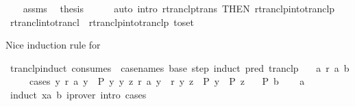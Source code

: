\begin{isabellebody}
\ \ \isamarkupfalse%
\ assms\ \isamarkupfalse%
\ {\isacharquery}{\kern0pt}thesis\isanewline
\ \ \ \ \isamarkupfalse%
\ {\isacharparenleft}{\kern0pt}auto\ intro{\isacharcolon}{\kern0pt}\ rtranclp{\isacharunderscore}{\kern0pt}trans\ {\isacharbrackleft}{\kern0pt}THEN\ rtranclp{\isacharunderscore}{\kern0pt}into{\isacharunderscore}{\kern0pt}tranclp{}{\isacharbrackright}{\kern0pt}{\isacharparenright}{\kern0pt}\isanewline
{}\isamarkupfalse%
%
\endisatagproof
{\isafoldproof}%
%
\isadelimproof
\isanewline
%
\endisadelimproof
\isanewline
{}\isamarkupfalse%
\ rtrancl{\isacharunderscore}{\kern0pt}into{\isacharunderscore}{\kern0pt}trancl{}\ {\isacharequal}{\kern0pt}\ rtranclp{\isacharunderscore}{\kern0pt}into{\isacharunderscore}{\kern0pt}tranclp{}\ {\isacharbrackleft}{\kern0pt}to{\isacharunderscore}{\kern0pt}set{\isacharbrackright}{\kern0pt}%
\begin{isamarkuptext}%
Nice induction rule for %
\end{isamarkuptext}\isamarkuptrue%
\isamarkupfalse%
\ tranclp{\isacharunderscore}{\kern0pt}induct\ {\isacharbrackleft}{\kern0pt}consumes\ {}{\isacharcomma}{\kern0pt}\ case{\isacharunderscore}{\kern0pt}names\ base\ step{\isacharcomma}{\kern0pt}\ induct\ pred{\isacharcolon}{\kern0pt}\ tranclp{\isacharbrackright}{\kern0pt}{\isacharcolon}{\kern0pt}\isanewline
\ \ \ a{\isacharcolon}{\kern0pt}\ {\isachardoublequoteopen}r\isactrlsup {\isacharplus}{\kern0pt}\isactrlsup {\isacharplus}{\kern0pt}\ a\ b{\isachardoublequoteclose}\isanewline
\ \ \ \ \ cases{\isacharcolon}{\kern0pt}\ {\isachardoublequoteopen}{\isasymAnd}y{\isachardot}{\kern0pt}\ r\ a\ y\ {\isasymLongrightarrow}\ P\ y{\isachardoublequoteclose}\ {\isachardoublequoteopen}{\isasymAnd}y\ z{\isachardot}{\kern0pt}\ r\isactrlsup {\isacharplus}{\kern0pt}\isactrlsup {\isacharplus}{\kern0pt}\ a\ y\ {\isasymLongrightarrow}\ r\ y\ z\ {\isasymLongrightarrow}\ P\ y\ {\isasymLongrightarrow}\ P\ z{\isachardoublequoteclose}\isanewline
\ \ \ {\isachardoublequoteopen}P\ b{\isachardoublequoteclose}\isanewline
%
\isadelimproof
\ \ %
\endisadelimproof
%
\isatagproof
{}\isamarkupfalse%
\ a\ \isamarkupfalse%
\ {\isacharparenleft}{\kern0pt}induct\ x{\isasymequiv}a\ b{\isacharparenright}{\kern0pt}\ {\isacharparenleft}{\kern0pt}iprover\ intro{\isacharcolon}{\kern0pt}\ cases{\isacharparenright}{\kern0pt}{\isacharplus}{\kern0pt}%
\endisatagproof

\end{isabellebody}

